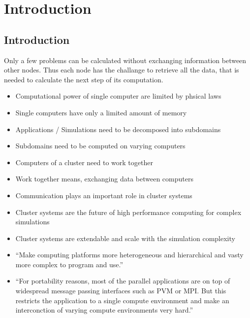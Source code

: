 \chapter{Introduction}
\label{sec:intro}



\section{Introduction}

Only a few problems can be calculated without exchanging information
between other nodes. Thus each node has the challange to retrieve all
the data, that is needed to calculate the next step of its
computation.

\begin{itemize}
\item Computational power of single computer are limited by phsical
  laws
\item Single computers have only a limited amount of memory
\item Applications / Simulations need to be decomposed into subdomains
\item Subdomains need to be computed on varying computers
\item Computers of a cluster need to work together
\item Work together means, exchanging data between computers
\item Communication plays an important role in cluster systems
\item Cluster systems are the future of high performance computing for complex simulations
\item Cluster systems are extendable and scale with the simulation complexity
\end{itemize}

\begin{itemize}
  \item ``Make computing platforms more heterogeneous and hierarchical
    and vasty more complex to program and use.''

  \item ``For portability reasons, most of the parallel applications are on top
    of widespread message passing interfaces such as PVM or MPI. But
    this restricts the application to a single compute environment and
    make an interconction of varying compute environments very hard.''

\end{itemize}


\cleardoublepage

